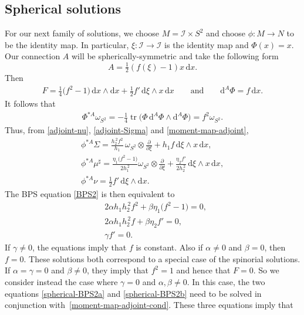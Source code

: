 \documentclass[pdftex]{sigma}
\newcommand{\II}{{\mathcal{I}}}
\newcommand{\1}{{\mathbb{1}}}
\newcommand{\bdy}{\partial}
\def \d{\mathrm{d}}
\newcommand{\tr}{{\operatorname{tr}}}
\numberwithin{equation}{section}
\begin{document}
\subsection{Spherical solutions}\label{sec:spherical}

For our next family of solutions, we choose $M=\II\times S^2$ and choose $\phi\colon M\to N$ to be the identity map. In particular, $\xi\colon \II\to\II$ is the identity map and $\Phi(x)=x$. Our connection $A$ will be spherically-symmetric and take the following form
\begin{equation}
\label{spherical-ansatz}
A = \tfrac12(f(\xi)-1) x\,\d x.
\end{equation}
Then
\begin{align*}
F = \tfrac14\bigl(f^2-1\bigr)\,\d x\wedge \d x +\tfrac{1}{2}f'\,\d\xi\wedge x\,\d x
\qquad\text{and}\qquad
\d^A\Phi = f\,\d x.
\end{align*}
It follows that
\begin{align*}
\Phi^{\ast A}\omega_{S^2}=-\tfrac14\tr\bigl(\Phi\,\d^A \Phi\wedge\d^A\Phi\bigr) = f^2\omega_{S^2}.
\end{align*}
Thus, from \eqref{adjoint-nu}, \eqref{adjoint-Sigma} and \eqref{moment-map-adjoint},
\begin{gather*}
\phi^{\ast A}\Sigma = \frac{h_2^{\,2}f^2}{h_1}\,\omega_{S^2}\otimes\frac{\bdy}{\bdy\xi}+h_1 f\,\d\xi\wedge x\,\d x, \\
\phi^{\ast A}\mu^\sharp = \frac{\eta_1\big(f^2-1\big)}{2h_1^{\,2}}\omega_{S^2}\otimes\frac{\bdy}{\bdy\xi} + \frac{\eta_2f'}{2h_2^{\,2}}\,\d\xi\wedge x\,\d x, \\
\phi^{\ast A}\nu = \tfrac{1}{2}f'\,\d\xi\wedge \d x.
\end{gather*}
The BPS equation \eqref{BPS2} is then equivalent to
\begin{align}
&2\alpha h_1h_2^{\,2}f^2+\beta\eta_1\big(f^2-1\big)=0, \label{spherical-BPS2a} \\
&2\alpha h_1h_2^{\,2}f+\beta\eta_2f'=0, \label{spherical-BPS2b}\\
&\gamma f' =0.\nonumber
\end{align}
If $\gamma\neq0$, the equations imply that $f$ is constant. Also if $\alpha\neq0$ and $\beta=0$, then $f=0$. These solutions both correspond to a special case of the spinorial solutions. If $\alpha=\gamma=0$ and $\beta\neq0$, they imply that $f^2=1$ and hence that $F=0$. So we consider instead the case where $\gamma=0$ and $\alpha,\beta\neq0$. In this case, the two equations \eqref{spherical-BPS2a} and \eqref{spherical-BPS2b} need to be solved in conjunction with~\eqref{moment-map-adjoint-cond}. These three equations imply that
\end{document}
